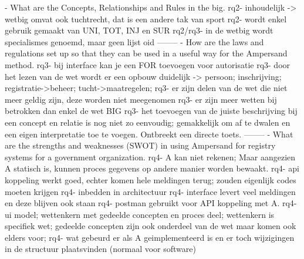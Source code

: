 \newline
[RQ2]- What are the Concepts, Relationships and Rules in the \acrshort{big}.
rq2- inhoudelijk -> wetbig omvat ook tuchtrecht, dat is een andere tak van sport
rq2- wordt enkel gebruik gemaakt van UNI, TOT, INJ en SUR
rq2/rq3- in de wetbig wordt specialismes genoemd, maar geen lijst oid
\newline
--------
\newline
[RQ3]- How are the laws and regulations set up so that they can be used in a useful way for the Ampersand method.
rq3- bij interface kan je een FOR toevoegen voor autorisatie
rq3- door het lezen van de wet wordt er een opbouw duidelijk -> persoon; inschrijving; registratie->beheer; tucht->maatregelen; 
rq3- er zijn delen van de wet die niet meer geldig zijn, deze worden niet meegenomen
rq3- er zijn meer wetten bij betrokken dan enkel de wet BIG
rq3- het toevoegen van de juiste beschrijving bij een concept en relatie is nog niet zo eenvoudig; gemakkelijk om af te dwalen en een eigen interpretatie toe te voegen. Ontbreekt een directe toets.
\newline
--------
\newline
[RQ4]- What are the strengths and weaknesses (SWOT) in using Ampersand for registry systems for a government organization.
rq4- A kan niet rekenen; Maar aangezien A statisch is, kunnen proces gegevens op andere manier worden bewaakt.
rq4- api koppeling werkt goed, echter komen hele meldingen terug; zouden eigenlijk codes moeten krijgen 
rq4- inbedden in architectuur 
rq4- interface levert veel meldingen en deze blijven ook staan
rq4- postman gebruikt voor API koppeling met A. 
rq4- ui model; wettenkern met gedeelde concepten en proces deel; wettenkern is specifiek wet; gedeelde concepten zijn ook onderdeel van de wet maar komen ook elders voor;
rq4- wat gebeurd er als A geimplementeerd is en er toch wijzigingen in de structuur plaatsvinden (normaal voor software)
